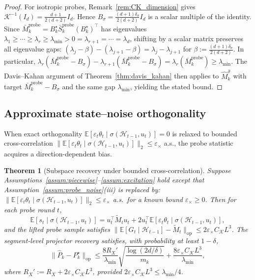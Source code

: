 \documentclass[12pt]{article}
\newcommand{\E}{\mathbb{E}}
\newcommand{\op}{\mathrm{op}}
\newcommand{\cH}{\mathcal{H}}
\newtheorem{theorem}{Theorem}
\theoremstyle{plain}
\theoremstyle{definition}
\begin{document}
\begin{proof}
For isotropic probes, Remark~\ref{rem:CK_dimension} gives $\mathcal{K}^{-1}(I_d) = \frac{d+1}{2(d+2)} I_d$. Hence $B_\sigma = \frac{(d+1)\delta_\sigma}{2(d+2)} I_d$ is a scalar multiple of the identity. Since $\bar{M}_k^{\mathrm{probe}} = B_k^\star \bar{S}_k^{\mathrm{probe}} (B_k^\star)^\top$ has eigenvalues $\lambda_1 \ge \cdots \ge \lambda_r \ge \lambda_{\min} > 0 = \lambda_{r+1} = \cdots = \lambda_d$, shifting by a scalar matrix preserves all eigenvalue gaps: $(\lambda_j - \beta) - (\lambda_{j+1} - \beta) = \lambda_j - \lambda_{j+1}$ for $\beta := \frac{(d+1)\delta_\sigma}{2(d+2)}$. In particular, $\lambda_r(\bar{M}_k^{\mathrm{probe}} - B_\sigma) - \lambda_{r+1}(\bar{M}_k^{\mathrm{probe}} - B_\sigma) = \lambda_r(\bar{M}_k^{\mathrm{probe}}) \ge \lambda_{\min}$. The Davis--Kahan argument of Theorem~\ref{thm:davis_kahan} then applies to $\widehat{M}_k^{\hat\sigma}$ with target $\bar{M}_k^{\mathrm{probe}} - B_\sigma$ and the same gap $\lambda_{\min}$, yielding the stated bound.
\end{proof}

\subsection{Approximate state--noise orthogonality}

When exact orthogonality $\E[\varepsilon_t \theta_t \mid \sigma(\cH_{t-1}, u_t)] = 0$ is relaxed to bounded cross-correlation $\|\E[\varepsilon_t \theta_t \mid \sigma(\cH_{t-1}, u_t)]\|_2 \le \varepsilon_\times$ a.s., the probe statistic acquires a direction-dependent bias.

\begin{theorem}[Subspace recovery under bounded cross-correlation]
\label{thm:robustness_coupling}
Suppose Assumptions~\ref{assum:piecewise}--\ref{assum:excitation} hold except that Assumption~\ref{assum:probe_noise}(iii) is replaced by: $\|\E[\varepsilon_t \theta_t \mid \sigma(\cH_{t-1}, u_t)]\|_2 \le \varepsilon_\times$ a.s.\ for a known bound $\varepsilon_\times \ge 0$. Then for each probe round $t$,
\[
\E[s_t \mid \sigma(\cH_{t-1}, u_t)] = u_t^\top \widetilde{M}_t u_t + 2u_t^\top \E[\varepsilon_t \theta_t \mid \sigma(\cH_{t-1}, u_t)],
\]
and the lifted probe sample satisfies $\|\E[G_t \mid \cH_{t-1}] - \widetilde{M}_t\|_{\op} \le 2\varepsilon_\times C_{\mathcal{K}} L^3$. The segment-level projector recovery satisfies, with probability at least $1 - \delta$,
\begin{equation}
\|\widehat{P}_k - P_k^\star\|_{\op}
\le \frac{8R_X'}{\lambda_{\min}} \sqrt{\frac{\log(2d/\delta)}{m_k}} + \frac{8\varepsilon_\times C_{\mathcal{K}} L^3}{\lambda_{\min}},
\label{eq:coupling_bound}
\end{equation}
where $R_X' := R_X + 2\varepsilon_\times C_{\mathcal{K}} L^3$, provided $2\varepsilon_\times C_{\mathcal{K}} L^3 \le \lambda_{\min}/4$.
\end{theorem}
\end{document}
